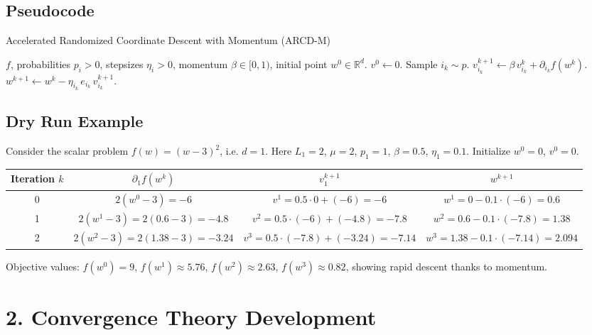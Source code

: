 \documentclass[11pt]{article}
\newcommand{\R}{\mathbb{R}}
\begin{document}
\subsection*{Pseudocode}
\begin{algorithm}[H]
\caption{Accelerated Randomized Coordinate Descent with Momentum (ARCD-M)}
\label{alg:arcd}
\begin{algorithmic}[1]
\REQUIRE $f$, probabilities $p_i>0$, stepsizes $\eta_i>0$, momentum $\beta\in[0,1)$,
          initial point $w^0\in\R^{d}$.
\STATE $v^{0}\gets 0$.
    \STATE Sample $i_k\sim p$.
    \STATE $v^{k+1}_{i_k}\gets \beta\,v^{k}_{i_k}+ \partial_{i_k}f(w^{k})$.
    \STATE $w^{k+1}\gets w^{k} - \eta_{i_k}\, e_{i_k}\, v^{k+1}_{i_k}$.
\ENDFOR
\end{algorithmic}
\end{algorithm}

\subsection*{Dry Run Example}
Consider the scalar problem $f(w)=(w-3)^{2}$, i.e. $d=1$.
Here $L_1=2$, $\mu=2$, $p_1=1$, $\beta=0.5$, $\eta_1=0.1$.
Initialize $w^{0}=0$, $v^{0}=0$.

\begin{center}
\begin{tabular}{c|c|c|c}
Iteration $k$ & $\partial_{1}f(w^{k})$ & $v^{k+1}_{1}$ & $w^{k+1}$ \\ \hline
0 & $2(w^{0}-3)=-6$ & $v^{1}=0.5\cdot0+(-6)=-6$ &
$w^{1}=0-0.1\cdot(-6)=0.6$ \\[2mm]
1 & $2(w^{1}-3)=2(0.6-3)=-4.8$ &
$v^{2}=0.5\cdot(-6)+(-4.8)=-7.8$ &
$w^{2}=0.6-0.1\cdot(-7.8)=1.38$ \\[2mm]
2 & $2(w^{2}-3)=2(1.38-3)=-3.24$ &
$v^{3}=0.5\cdot(-7.8)+(-3.24)=-7.14$ &
$w^{3}=1.38-0.1\cdot(-7.14)=2.094$ 
\end{tabular}
\end{center}

Objective values: $f(w^{0})=9$, $f(w^{1})\approx5.76$, $f(w^{2})\approx2.63$, $f(w^{3})\approx0.82$,
showing rapid descent thanks to momentum.

\section*{2. Convergence Theory Development}
\end{document}
